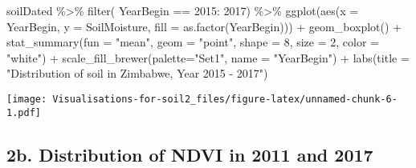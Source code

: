 \documentclass[
]{article}
\newenvironment{Shaded}{\begin{snugshade}}{\end{snugshade}}
\newcommand{\AttributeTok}[1]{\textcolor[rgb]{0.77,0.63,0.00}{#1}}
\newcommand{\DecValTok}[1]{\textcolor[rgb]{0.00,0.00,0.81}{#1}}
\newcommand{\FunctionTok}[1]{\textcolor[rgb]{0.00,0.00,0.00}{#1}}
\newcommand{\NormalTok}[1]{#1}
\newcommand{\SpecialCharTok}[1]{\textcolor[rgb]{0.00,0.00,0.00}{#1}}
\newcommand{\StringTok}[1]{\textcolor[rgb]{0.31,0.60,0.02}{#1}}
\begin{document}
\begin{Shaded}
\begin{Highlighting}[]
\NormalTok{soilDated }\SpecialCharTok{\%\textgreater{}\%} 
  \FunctionTok{filter}\NormalTok{( YearBegin }\SpecialCharTok{==} \DecValTok{2015}\SpecialCharTok{:} \DecValTok{2017}\NormalTok{) }\SpecialCharTok{\%\textgreater{}\%} 
  \FunctionTok{ggplot}\NormalTok{(}\FunctionTok{aes}\NormalTok{(}\AttributeTok{x =}\NormalTok{ YearBegin, }\AttributeTok{y =}\NormalTok{ SoilMoisture, }\AttributeTok{fill =} \FunctionTok{as.factor}\NormalTok{(YearBegin))) }\SpecialCharTok{+} 
  \FunctionTok{geom\_boxplot}\NormalTok{() }\SpecialCharTok{+}
  \FunctionTok{stat\_summary}\NormalTok{(}\AttributeTok{fun =} \StringTok{"mean"}\NormalTok{, }\AttributeTok{geom =} \StringTok{"point"}\NormalTok{, }\AttributeTok{shape =} \DecValTok{8}\NormalTok{,}
               \AttributeTok{size =} \DecValTok{2}\NormalTok{, }\AttributeTok{color =} \StringTok{"white"}\NormalTok{) }\SpecialCharTok{+}
  \FunctionTok{scale\_fill\_brewer}\NormalTok{(}\AttributeTok{palette=}\StringTok{"Set1"}\NormalTok{, }\AttributeTok{name =} \StringTok{"YearBegin"}\NormalTok{) }\SpecialCharTok{+}
  \FunctionTok{labs}\NormalTok{(}\AttributeTok{title =} \StringTok{"Distribution of soil in Zimbabwe, Year 2015 {-} 2017"}\NormalTok{) }
\end{Highlighting}
\end{Shaded}

\texttt{[image: Visualisations-for-soil2\_files/figure-latex/unnamed-chunk-6-1.pdf]}

\hypertarget{b.-distribution-of-ndvi-in-2011-and-2017}{%
\subsection{2b. Distribution of NDVI in 2011 and
2017}\label{b.-distribution-of-ndvi-in-2011-and-2017}}
\end{document}
